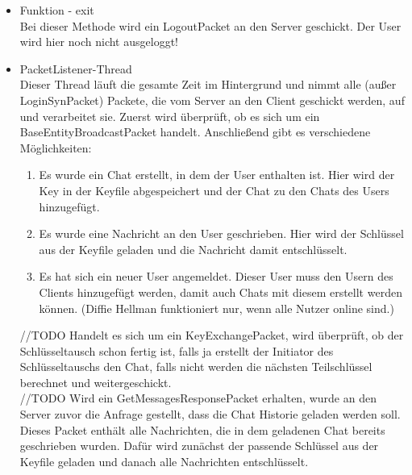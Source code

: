 \begin{itemize}
    
    \item Funktion - exit \\
    Bei dieser Methode wird ein LogoutPacket an den Server geschickt. Der User wird hier noch nicht ausgeloggt!
    
    \item PacketListener-Thread \\
    Dieser Thread läuft die gesamte Zeit im Hintergrund und nimmt alle (außer LoginSynPacket) Packete, die vom Server
    an den Client geschickt werden, auf und verarbeitet sie.
    Zuerst wird überprüft, ob es sich um ein BaseEntityBroadcastPacket handelt. Anschließend gibt es verschiedene Möglichkeiten: \\
    \begin{enumerate}
        \item Es wurde ein Chat erstellt, in dem der User enthalten ist. Hier wird der Key in der Keyfile abgespeichert
        und der Chat zu den Chats des Users hinzugefügt.
        \item Es wurde eine Nachricht an den User geschrieben. Hier wird der Schlüssel aus der Keyfile geladen und die
        Nachricht damit entschlüsselt.
        \item Es hat sich ein neuer User angemeldet. Dieser User muss den Usern des Clients hinzugefügt werden, damit auch
        Chats mit diesem erstellt werden können. (Diffie Hellman funktioniert nur, wenn alle Nutzer online sind.)
    \end{enumerate}
    //TODO
    Handelt es sich um ein KeyExchangePacket, wird überprüft, ob der Schlüsseltausch schon fertig ist,
    falls ja erstellt der Initiator des Schlüsseltauschs den Chat, falls nicht werden die nächsten
    Teilschlüssel berechnet und weitergeschickt.\\
    //TODO
    Wird ein GetMessagesResponsePacket erhalten, wurde an den Server zuvor die Anfrage gestellt, dass die Chat Historie
    geladen werden soll. Dieses Packet enthält alle Nachrichten, die in dem geladenen Chat bereits geschrieben wurden.
    Dafür wird zunächst der passende Schlüssel aus der Keyfile geladen und danach alle Nachrichten entschlüsselt.

\end{itemize}
